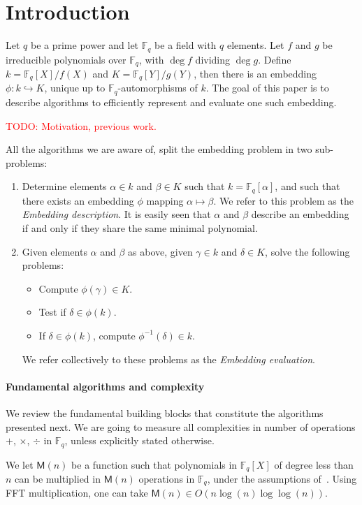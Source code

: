 \documentclass[12pt]{article}
\theoremstyle{plain}
\theoremstyle{definition}
\newcommand{\todo}[1]{\textcolor{red}{TODO: #1}}
\def\F{\ensuremath{\mathbb{F}}}
\def\MM{\ensuremath{\mathsf{M}}}
\newcounter{algorithm}
\begin{document}
\section{Introduction}

Let $q$ be a prime power and let $\F_q$ be a field with $q$
elements. Let $f$ and $g$ be irreducible polynomials over $\F_q$, with
$\deg f$ dividing $\deg g$. Define $k=\F_q[X]/f(X)$ and
$K=\F_q[Y]/g(Y)$, then there is an embedding $\phi:k\hookrightarrow
K$, unique up to $\F_q$-automorphisms of $k$. The goal of this paper
is to describe algorithms to efficiently represent and evaluate one
such embedding.

\todo{Motivation, previous work.}

All the algorithms we are aware of, split the embedding problem in two
sub-problems:
\begin{enumerate}
\item Determine elements $\alpha\in k$ and $\beta\in K$ such that
  $k=\F_q[\alpha]$, and such that there exists an
  embedding $\phi$ mapping $\alpha\mapsto\beta$. We refer to this
  problem as the \emph{Embedding description}.
  It is easily seen that $\alpha$ and $\beta$ describe an embedding
  if and only if they share the same minimal polynomial.
\item Given elements $\alpha$ and $\beta$ as above, given $\gamma\in
  k$ and $\delta\in K$, solve the following problems:
  \begin{itemize}
  \item Compute $\phi(\gamma)\in K$.
  \item Test if $\delta\in\phi(k)$.
  \item If $\delta\in\phi(k)$, compute $\phi^{-1}(\delta)\in k$.
  \end{itemize}
  We refer collectively to these problems as the \emph{Embedding
    evaluation}.
\end{enumerate}


\paragraph{Fundamental algorithms and complexity}
We review the fundamental building blocks that constitute the
algorithms presented next.  We are going to measure all complexities
in number of operations $+$, $\times$, $\div$ in $\F_q$, unless
explicitly stated otherwise.

We let $\MM(n)$ be a function such that polynomials in $\F_q[X]$ of
degree less than $n$ can be multiplied in $\MM(n)$ operations in
$\F_q$, under the assumptions of~\cite[Ch.~8.3]{vzGG}. Using FFT
multiplication, one can take $\MM(n)\in O(n\log (n) \log\log (n))$.
\end{document}
